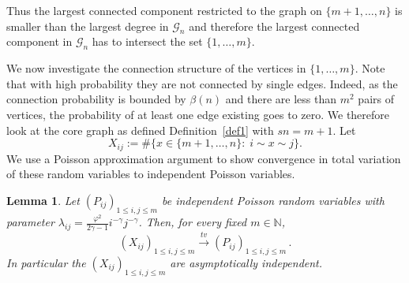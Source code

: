 \documentclass[12pt,a4paper]{article}
\numberwithin{equation}{section}
\newtheorem{lemma}[shared]{Lemma}
\begin{document}
Thus the largest connected component restricted to the graph on $\{m+1,\dots,n\}$ is smaller than the largest degree in $\mathscr G_n$ and therefore the largest connected component in $\mathscr G_n$ has to intersect the set $\{1,\dots,m\}$. 
\smallskip

We now investigate the connection structure of the vertices in $\{1,\dots,m\}$. Note that with high probability they are not connected by single edges. Indeed, as the connection probability is bounded by $\beta(n)$ and there are less than $m^2$ pairs of vertices, the probability of at least one edge existing goes to zero. We therefore look at the core graph as defined Definition~\ref{def1} with $sn=m+1$. Let 
$$X_{ij}:=\#\{x\in\{m+1,\dots,n\}:\; i\sim x \sim j \}.$$ 
We use a Poisson approximation argument to show convergence in total variation of these random variables to independent Poisson variables.


\begin{lemma}\label{indep}
    Let $(P_{ij})_{1\le i,j\le m}$ be independent Poisson random variables with parameter $\lambda_{ij}=\frac{\varphi^2}{2\gamma-1} i^{-\gamma}j^{-\gamma}$. Then, for every fixed $m\in\mathbb N$,
    $$ (X_{ij})_{1\le i,j\le m} \overset{tv}{\longrightarrow}(P_{ij})_{1\le i,j\le m}\,.$$
    In particular the $(X_{ij})_{1\le i,j\le m}$ are asymptotically independent.
\end{lemma}
\end{document}
